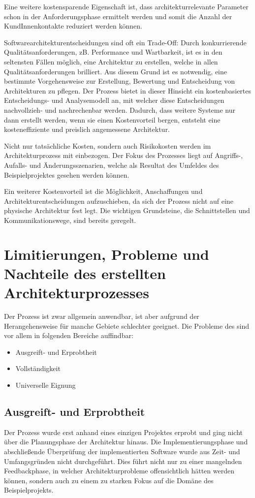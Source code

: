 Eine weitere kostensparende Eigenschaft ist, dass architekturrelevante Parameter schon in der Anforderungsphase ermittelt werden und somit die Anzahl der KundInnenkontakte reduziert werden können.

Softwarearchitekturentscheidungen sind oft ein Trade-Off: Durch konkurrierende Qualitätsanforderungen, zB. Performance und Wartbarkeit, ist es in den seltensten Fällen möglich, eine Architektur zu erstellen, welche in allen Qualitätsanforderungen brilliert. Aus diesem Grund ist es notwendig, eine bestimmte Vorgehensweise zur Erstellung, Bewertung und Entscheidung von Architekturen zu pflegen. Der Prozess bietet in dieser Hinsicht ein kostenbasiertes Entscheidungs- und Analysemodell an, mit welcher diese Entscheidungen nachvollzieh- und nachrechenbar werden. Dadurch, dass weitere Systeme nur dann erstellt werden, wenn sie einen Kostenvorteil bergen, entsteht eine kosteneffiziente und preislich angemessene Architektur.

Nicht nur tatsächliche Kosten, sondern auch Risikokosten werden im Architekturprozess mit einbezogen. Der Fokus des Prozesses liegt auf Angriffs-, Aufalls- und Änderungsszenarien, welche als Resultat des Umfeldes des Beispielprojektes gesehen werden können.

Ein weiterer Kostenvorteil ist die Möglichkeit, Anschaffungen und Architekturentscheidungen aufzuschieben, da sich der Prozess nicht auf eine physische Architektur fest legt. Die wichtigen Grundsteine, die Schnittstellen und Kommunikationswege, sind bereits geregelt.


\section{Limitierungen, Probleme und Nachteile des erstellten Architekturprozesses}
Der Prozess ist zwar allgemein anwendbar, ist aber aufgrund der Herangehensweise für manche Gebiete schlechter geeignet. Die Probleme des sind vor allem in folgenden Bereiche auffindbar:

\begin{itemize}
  \item Ausgreift- und Erprobtheit
  \item Vollständigkeit
  \item Universelle Eignung
\end{itemize}

\subsection{Ausgreift- und Erprobtheit}
Der Prozess wurde erst anhand eines einzigen Projektes erprobt und ging nicht über die Planungsphase der Architektur hinaus. Die Implementierungsphase und abschließende Überprüfung der implementierten Software wurde aus Zeit- und Umfangsgründen nicht durchgeführt. Dies führt nicht nur zu einer mangelnden Feedbackphase, in welcher Architekturprobleme offensichtlich hätten werden können, sondern auch zu einem zu starken Fokus auf die Domäne des Beispielprojekts.

